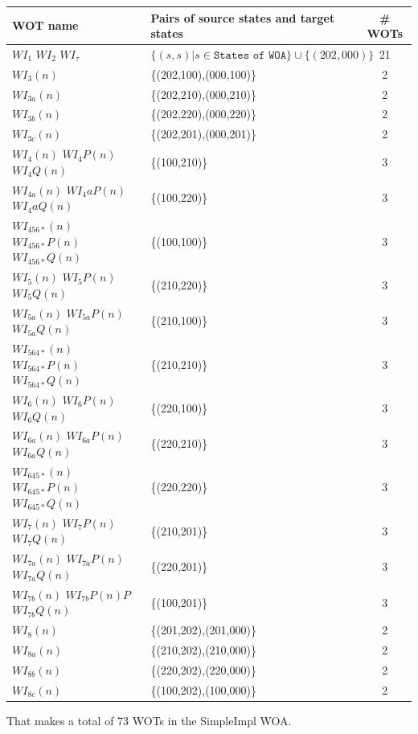 \documentclass{lmcs}
\begin{document}
\noindent\begin{tabular}{|@{\,}l@{\,}|@{\,}l@{\,}|@{\,}c@{\,}|}
\hline
    WOT name & Pairs of source states and target states & \# WOTs \\
    \hline
    $WI_1$ $WI_2$ $WI_\tau$ & $\{(s,s)| s \in \texttt{States of WOA}\} \cup \{(202,000)\} $ & 21 \\
    $WI_3(n)$ & \{(202,100),(000,100)\} & 2 \\
    $WI_{3a}(n)$ & \{(202,210),(000,210)\} & 2 \\
    $WI_{3b}(n)$ & \{(202,220),(000,220)\} & 2 \\
    $WI_{3c}(n)$ & \{(202,201),(000,201)\} & 2 \\
    $WI_4(n)$ $WI_4P(n)$ $WI_4Q(n)$ & \{(100,210)\} & 3 \\
    $WI_{4a}(n)$ $WI_4aP(n)$ $WI_4aQ(n)$ & \{(100,220)\} & 3 \\
    $WI_{456*}(n) $ $WI_{456*}P(n) $ $WI_{456*}Q(n) $ & \{(100,100)\} & 3 \\
    $WI_5(n)$ $WI_5P(n)$ $WI_5Q(n)$ & \{(210,220)\} & 3 \\
    $WI_{5a}(n)$ $WI_{5a}P(n)$ $WI_{5a}Q(n)$ & \{(210,100)\} & 3 \\
    $WI_{564*}(n) $ $WI_{564*}P(n) $ $WI_{564*}Q(n) $ & \{(210,210)\} & 3 \\
    $WI_6(n)$ $WI_6P(n)$ $WI_6Q(n)$ & \{(220,100)\} & 3 \\
    $WI_{6a}(n)$ $WI_{6a}P(n)$ $WI_{6a}Q(n)$ & \{(220,210)\} & 3 \\
    $WI_{645*}(n) $ $WI_{645*}P(n) $ $WI_{645*}Q(n) $ & \{(220,220)\} & 3 \\
    $WI_7(n)$ $WI_7P(n)$ $WI_7Q(n)$ & \{(210,201)\} & 3 \\
    $WI_{7a}(n)$ $WI_{7a}P(n)$ $WI_{7a}Q(n)$ & \{(220,201)\} & 3 \\
    $WI_{7b}(n)$ $WI_{7b}P(n)P$ $WI_{7b}Q(n)$ & \{(100,201)\} & 3 \\
    $WI_8(n)$ & \{(201,202),(201,000)\} & 2\\ 
    $WI_{8a}(n)$ & \{(210,202),(210,000)\} & 2 \\
    $WI_{8b}(n)$ & \{(220,202),(220,000)\} & 2 \\
    $WI_{8c}(n)$ & \{(100,202),(100,000)\} & 2 \\
   
    \hline
    \end{tabular}

    \bigskip
    That makes a total of 73 WOTs  in the SimpleImpl WOA.
\end{document}
